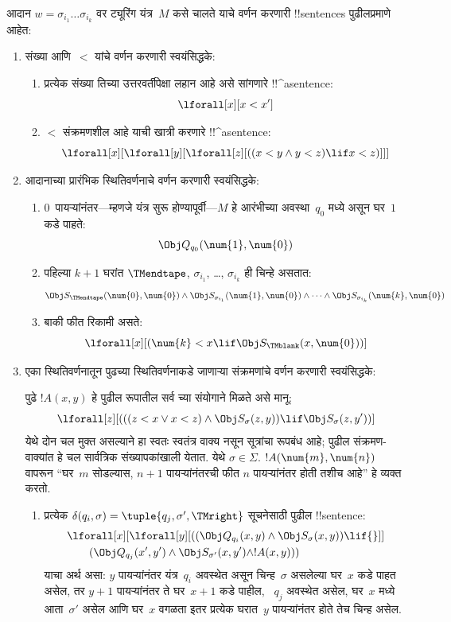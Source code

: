 \documentclass[../../../include/open-logic-section]{subfiles}
\begin{document}
आदान $w = \sigma_{i_1}\dots\sigma_{i_k}$
वर ट्यूरिंग यंत्र~$M$ कसे चालते याचे
वर्णन करणारी !!{sentence}s
पुढीलप्रमाणे आहेत:
\begin{enumerate}
\item संख्या आणि~$<$ यांचे वर्णन
करणारी स्वयंसिद्धके:
\begin{enumerate}
\item प्रत्येक संख्या तिच्या उत्तरवर्तीपेक्षा
लहान आहे असे सांगणारे !!^a{sentence}:
\[
\lforall[x][x < x']
\]
\item $<$ संक्रमणशील आहे याची
खात्री करणारे !!^a{sentence}:
\[
\lforall[x][\lforall[y][\lforall[z][
      ((x < y \land y < z) \lif x < z)]]]
\]
\end{enumerate}
\item आदानाच्या प्रारंभिक स्थितिवर्णनाचे
वर्णन करणारी स्वयंसिद्धके:
\begin{enumerate}
\item $0$~पायऱ्यांनंतर---म्हणजे
  यंत्र सुरू होण्यापूर्वी---$M$
  हे आरंभीच्या अवस्था~$q_0$
  मध्ये असून घर~$1$ कडे पाहते:
\[
\Obj Q_{q_0}(\num{1}, \num{0})
\]
\item पहिल्या $k+1$ घरांत
  $\TMendtape$, $\sigma_{i_1}$,
  \dots, $\sigma_{i_k}$ ही चिन्हे
  असतात:
\[
\Obj S_\TMendtape(\num{0}, \num{0}) \land
\Obj S_{\sigma_{i_1}}(\num{1}, \num{0}) \land
\dots \land
\Obj S_{\sigma_{i_k}}(\num{k}, \num{0})
\]
\item बाकी फीत रिकामी असते:
\[
\lforall[x][(\num{k} < x \lif \Obj S_\TMblank(x, \num{0}))]
\]
\end{enumerate}
\item एका स्थितिवर्णनातून पुढच्या
स्थितिवर्णनाकडे जाणाऱ्या संक्रमणांचे
वर्णन करणारी स्वयंसिद्धके:

पुढे $!A(x, y)$ हे पुढील
रूपातील सर्व च्या
संयोगाने मिळते असे मानू:
\[
\lforall[z][
  (((z < x \lor x < z) \land \Obj S_\sigma(z, y))
  \lif \Obj S_\sigma(z, y'))]
\]
येथे दोन चल मुक्त असल्याने हा स्वतः स्वतंत्र वाक्य
नसून सूत्रांचा रूपबंध आहे; पुढील संक्रमण-वाक्यांत
हे चल सार्वत्रिक संख्यापकांखाली येतात.
%
येथे $\sigma \in \Sigma$.
$!A(\num{m},\num{n})$ वापरून
“घर~$m$ सोडल्यास, $n+1$
पायऱ्यांनंतरची फीत $n$
पायऱ्यांनंतर होती तशीच आहे”
हे व्यक्त करतो.
\begin{enumerate}
\item {} प्रत्येक
  $\delta(q_i, \sigma) =
  \tuple{q_j, \sigma', \TMright}$
  सूचनेसाठी पुढील !!{sentence}:
\begin{align*}
& \lforall[x][\lforall[y][(
   (\Obj Q_{q_i}(x, y) \land \Obj S_{\sigma}(x, y)) \lif {}]] \\
&\qquad   (\Obj Q_{q_j}(x', y') \land \Obj S_{\sigma'}(x, y') \land
!A(x, y)))
\end{align*}
याचा अर्थ असा: $y$ पायऱ्यांनंतर
यंत्र~$q_i$ अवस्थेत असून
चिन्ह~$\sigma$ असलेल्या
घर~$x$ कडे पाहत असेल,
तर $y+1$ पायऱ्यांनंतर
ते घर~$x+1$ कडे पाहील,
~$q_j$ अवस्थेत असेल,
घर~$x$ मध्ये आता~$\sigma'$
असेल आणि घर~$x$ वगळता
इतर प्रत्येक घरात~$y$
पायऱ्यांनंतर होते तेच
चिन्ह असेल.


\end{enumerate}
\end{enumerate}
\end{document}
